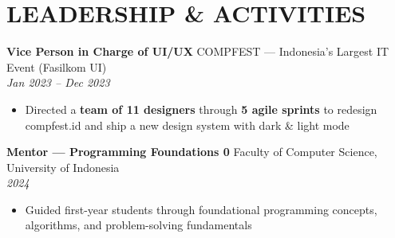 \documentclass[10pt,a4paper]{article}
\newcommand{\experienceheader}[4]{
    \textbf{#1} \hfill #2 \\
    \textit{#3} \hfill \textit{#4}
}
\begin{document}
\vspace{-4pt}

\section*{LEADERSHIP \& ACTIVITIES}

\experienceheader{Vice Person in Charge of UI/UX}{COMPFEST — Indonesia's Largest IT Event (Fasilkom UI)}{}{Jan 2023 -- Dec 2023}
\begin{itemize}[leftmargin=*, itemsep=0.5pt, topsep=1pt]
    \item Directed a \textbf{team of 11 designers} through \textbf{5 agile sprints} to redesign compfest.id and ship a new design system with dark \& light mode
\end{itemize}

\vspace{2pt}

\experienceheader{Mentor — Programming Foundations 0}{Faculty of Computer Science, University of Indonesia}{}{2024}
\begin{itemize}[leftmargin=*, itemsep=0.5pt, topsep=1pt]
    \item Guided first-year students through foundational programming concepts, algorithms, and problem-solving fundamentals
\end{itemize}
\end{document}
